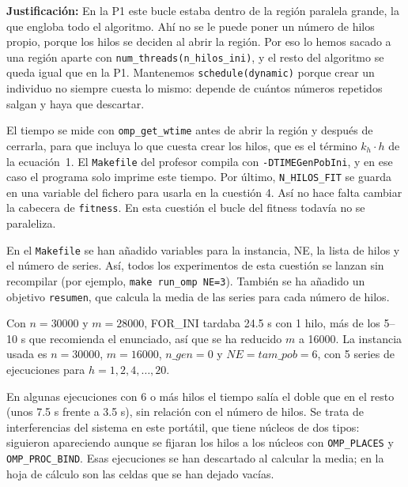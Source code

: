 \documentclass[12pt]{article}
\begin{document}
\begin{enumerate}
\textbf{Justificación:} En la P1 este bucle estaba dentro de la región paralela grande, la que engloba todo el algoritmo. Ahí no se le puede poner un número de hilos propio, porque los hilos se deciden al abrir la región. Por eso lo hemos sacado a una región aparte con \texttt{num\_threads(n\_hilos\_ini)}, y el resto del algoritmo se queda igual que en la P1. Mantenemos \texttt{schedule(dynamic)} porque crear un individuo no siempre cuesta lo mismo: depende de cuántos números repetidos salgan y haya que descartar.

El tiempo se mide con \texttt{omp\_get\_wtime} antes de abrir la región y después de cerrarla, para que incluya lo que cuesta crear los hilos, que es el término $k_h \cdot h$ de la ecuación~1. El \texttt{Makefile} del profesor compila con \texttt{-DTIMEGenPobIni}, y en ese caso el programa solo imprime este tiempo. Por último, \texttt{N\_HILOS\_FIT} se guarda en una variable del fichero para usarla en la cuestión 4. Así no hace falta cambiar la cabecera de \texttt{fitness}. En esta cuestión el bucle del fitness todavía no se paraleliza.

\vspace{0.5cm}

En el \texttt{Makefile} se han añadido variables para la instancia, NE, la lista de hilos y el número de series. Así, todos los experimentos de esta cuestión se lanzan sin recompilar (por ejemplo, \texttt{make run\_omp NE=3}). También se ha añadido un objetivo \texttt{resumen}, que calcula la media de las series para cada número de hilos.

Con $n = 30000$ y $m = 28000$, FOR\_INI tardaba 24.5 s con 1 hilo, más de los 5--10 s que recomienda el enunciado, así que se ha reducido $m$ a 16000. La instancia usada es $n = 30000$, $m = 16000$, $n\_gen = 0$ y $NE = tam\_pob = 6$, con 5 series de ejecuciones para $h = 1, 2, 4, \dots, 20$.

En algunas ejecuciones con 6 o más hilos el tiempo salía el doble que en el resto (unos 7.5 s frente a 3.5 s), sin relación con el número de hilos. Se trata de interferencias del sistema en este portátil, que tiene núcleos de dos tipos: siguieron apareciendo aunque se fijaran los hilos a los núcleos con \texttt{OMP\_PLACES} y \texttt{OMP\_PROC\_BIND}. Esas ejecuciones se han descartado al calcular la media; en la hoja de cálculo son las celdas que se han dejado vacías.


\end{enumerate}
\end{document}
